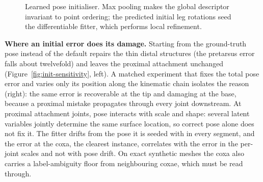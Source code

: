 \begin{figure}[!htb]
\centering
{}
\caption[Learned pose initialiser]{Learned pose initialiser. Max pooling makes the
global descriptor invariant to point ordering; the predicted initial leg rotations
seed the differentiable fitter, which performs local refinement.}
\label{fig:pointnet}
\end{figure}

\textbf{Where an initial error does its damage.} Starting from the ground-truth
pose instead of the default repairs the thin distal structures (the pretarsus
error falls about twelvefold) and leaves the proximal attachment unchanged
(Figure~\ref{fig:init-sensitivity}, left). A matched experiment that fixes the total
pose error and varies only its position along the kinematic chain isolates the
reason (right): the same error is recoverable at the tip and damaging at the base,
because a proximal mistake propagates through every joint downstream. At proximal
attachment joints, pose interacts with scale and shape: several latent variables
jointly determine the same surface location, so correct pose alone does not fix it.
The fitter drifts from the pose it is seeded with in every segment, and the error
at the coxa, the clearest instance, correlates with the error in the per-joint
scales and not with pose drift. On exact synthetic meshes the coxa also carries a
label-ambiguity floor from neighbouring coxae, which must be read through.

